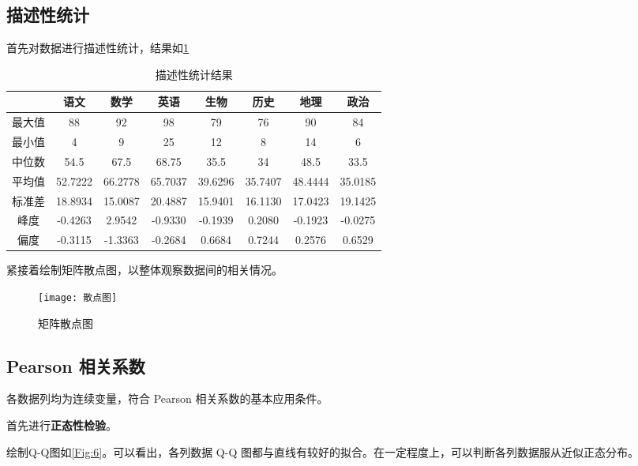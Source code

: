\documentclass[withoutpreface]{cumcmthesis}
\begin{document}
\subsection{描述性统计}

首先对数据进行描述性统计，结果如\cref{Tab:2}

\begin{table}[H]
    \centering
    \caption{描述性统计结果}\label{Tab:2}
    \begin{tabular}{|c|c|c|c|c|c|c|c|}
        \hline
            & 语文      & 数学      & 英语      & 生物      & 历史      & 地理      & 政治      \\
        \hline
        最大值 & 88      & 92      & 98      & 79      & 76      & 90      & 84      \\
        \hline
        最小值 & 4       & 9       & 25      & 12      & 8       & 14      & 6       \\
        \hline
        中位数 & 54.5    & 67.5    & 68.75   & 35.5    & 34      & 48.5    & 33.5    \\
        \hline
        平均值 & 52.7222 & 66.2778 & 65.7037 & 39.6296 & 35.7407 & 48.4444 & 35.0185 \\
        \hline
        标准差 & 18.8934 & 15.0087 & 20.4887 & 15.9401 & 16.1130 & 17.0423 & 19.1425 \\
        \hline
        峰度  & -0.4263 & 2.9542  & -0.9330 & -0.1939 & 0.2080  & -0.1923 & -0.0275 \\
        \hline
        偏度  & -0.3115 & -1.3363 & -0.2684 & 0.6684  & 0.7244  & 0.2576  & 0.6529  \\
        \hline
    \end{tabular}
\end{table}

紧接着绘制矩阵散点图，以整体观察数据间的相关情况。
\begin{figure}[H]
    \centering
    \texttt{[image: 散点图]}
    \caption{矩阵散点图}\label{Fig:5}
\end{figure}
\subsection{Pearson 相关系数}

各数据列均为连续变量，符合 Pearson 相关系数的基本应用条件。

首先进行\textbf{正态性检验}。

绘制Q-Q图如\cref{Fig:6}。可以看出，各列数据 Q-Q 图都与直线有较好的拟合。在一定程度上，可以判断各列数据服从近似正态分布。
\end{document}
